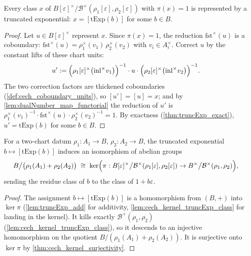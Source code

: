 \begin{theorem}
  \label{thm:cech_kernel_surjectivity}
  \leanok
  Every class \(x\) of
  \(B[\varepsilon]^\times / \mathcal B^\times(\rho_1[\varepsilon],
  \rho_2[\varepsilon])\) with \(\pi(x) = 1\) is represented by a truncated exponential:
  \(x = [\mathrm{tExp}(b)]\) for some \(b \in B\).
\end{theorem}
\begin{proof}
  \leanok
  Let \(u \in B[\varepsilon]^\times\) represent \(x\). Since \(\pi(x) = 1\), the
  reduction \(\mathrm{fst}^\times(u)\) is a coboundary:
  \(\mathrm{fst}^\times(u) = \rho_1^\times(v_1)\,\rho_2^\times(v_2)\) with
  \(v_i \in A_i^\times\). Correct \(u\) by the constant lifts of these chart units:
  \[
    u' := \Bigl(\rho_1[\varepsilon]^\times\bigl(\mathrm{inl}^\times v_1\bigr)\Bigr)^{-1}
      \cdot u \cdot
      \Bigl(\rho_2[\varepsilon]^\times\bigl(\mathrm{inl}^\times v_2\bigr)\Bigr)^{-1}.
  \]
  The two correction factors are thickened coboundaries
  (\ref{def:cech_coboundary_units}), so \([u'] = [u] = x\); and by
  \ref{lem:dualNumber_map_functorial} the reduction of \(u'\) is
  \(\rho_1^\times(v_1)^{-1} \cdot \mathrm{fst}^\times(u) \cdot \rho_2^\times(v_2)^{-1}
  = 1\). By exactness (\ref{thm:truncExp_exact}), \(u' = \mathrm{tExp}(b)\) for some
  \(b \in B\).
\end{proof}

\begin{theorem}
  \label{thm:truncExp_cech_kernel_equiv}
  \leanok
  For a two-chart datum \(\rho_1 : A_1 \to B\), \(\rho_2 : A_2 \to B\), the truncated
  exponential \(b \mapsto [\mathrm{tExp}(b)]\) induces an isomorphism of abelian groups
  \[
    B \big/ \bigl(\rho_1(A_1) + \rho_2(A_2)\bigr)
    \;\cong\;
    \ker\Bigl( \pi :
      B[\varepsilon]^\times \big/ \mathcal B^\times(\rho_1[\varepsilon],
        \rho_2[\varepsilon])
      \to B^\times \big/ \mathcal B^\times(\rho_1, \rho_2) \Bigr),
  \]
  sending the residue class of \(b\) to the class of \(1 + b\varepsilon\).
\end{theorem}
\begin{proof}
  \leanok
  The assignment \(b \mapsto [\mathrm{tExp}(b)]\) is a homomorphism from \((B, +)\) into
  \(\ker \pi\) (\ref{lem:truncExp_add} for additivity,
  \ref{lem:cech_kernel_truncExp_class} for landing in the kernel). It kills exactly
  \(\mathcal B^+(\rho_1, \rho_2)\) (\ref{lem:cech_kernel_truncExp_class}), so it
  descends to an injective homomorphism on the quotient
  \(B/(\rho_1(A_1) + \rho_2(A_2))\). It is surjective onto \(\ker \pi\) by
  \ref{thm:cech_kernel_surjectivity}.
\end{proof}

